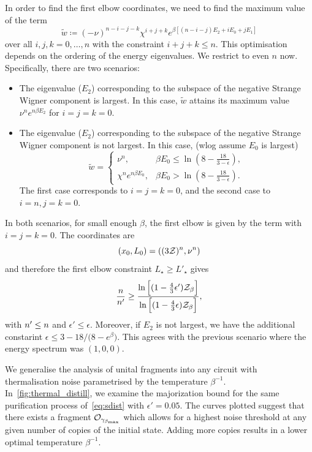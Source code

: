 \documentclass[pra,
aps,
twocolumn,
superscriptaddress,
groupedaddress,
nofootinbib,
reprint
]{revtex4-1}
\begin{document}
In order to find the first elbow coordinates, we need to find the maximum value of the term
\begin{equation}
	\tilde{w} \coloneqq (-\nu)^{n-i-j-k} \chi^{i+j+k} e^{\beta [(n-i-j)E_2 + iE_0 + jE_1]}
\end{equation}
over all $i,j,k = 0,\dots,n$ with the constraint $i+j+k \leq n$.
This optimisation depends on the ordering of the energy eigenvalues.
We restrict to even $n$ now.
Specifically, there are two scenarios:
\begin{itemize}
	\item The eigenvalue ($E_2$) corresponding to the subspace of the negative Strange Wigner component is largest.
	In this case, $\tilde{w}$ attains its maximum value $\nu^n e^{n\beta E_2}$ for $i=j=k=0$.
	\item The eigenvalue ($E_2$) corresponding to the subspace of the negative Strange Wigner component is not largest.
	In this case, (wlog assume $E_0$ is largest)
	\begin{equation}
	  \tilde{w} =
     \begin{cases}
		\nu^n, &\beta E_0 \leq \ln{\left(8-\frac{18}{3-\epsilon}\right)}, \\
		\chi^n e^{n\beta E_0}, &\beta E_0 > \ln{\left(8-\frac{18}{3-\epsilon}\right)}.
	  \end{cases}
	\end{equation}
	The first case corresponds to $i=j=k=0$, and the second case to $i=n,j=k=0$.
\end{itemize}
In both scenarios, for small enough $\beta$, the first elbow is given by the term with $i=j=k=0$.
The coordinates are
\begin{equation}
	(x_0, L_0) = ((3\Z)^n, \nu^n)
\end{equation}
and therefore the first elbow constraint $L_\star \geq L'_\star$ gives
\begin{align}
	\frac{n}{n'} \geq \frac{\ln{\Big[ (1-\frac{4}{3}\epsilon')\Z_\beta \Big]}}{\ln{\Big[ (1-\frac{4}{3}\epsilon)\Z_\beta \Big]}},
\end{align}
with $\tt \leq n$ and $\epsilon' \leq \epsilon$. 
Moreover, if $E_2$ is not largest, we have the additional constarint $\epsilon \leq 3 - 18/\big(8-e^{\beta}\big)$.
This agrees with the previous scenario where the energy spectrum was $(1,0,0)$.



\null\newpage
\null\newpage

We generalise the analysis of unital fragments into any circuit with thermalisation noise parametrised by the temperature $\beta^{-1}$.
In~\cref{fig:thermal_distill}, we examine the majorization bound for the same purification process of~\cref{eq:sdist} with $\epsilon' = 0.05$.
The curves plotted suggest that there exists a fragment $\O_{\gamma_{\beta_{\rm{max}}}}$ which allows for a highest noise threshold at any given number of copies of the initial state.
Adding more copies results in a lower optimal temperature $\beta^{-1}$.
\end{document}
